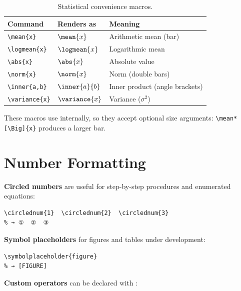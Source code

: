 \begin{table}[htbp]
  \centering
  \caption{Statistical convenience macros.}
  \label{tab:stat-macros}
  \begin{tabular}{@{}lll@{}}
    \toprule
    Command                                 & Renders as & Meaning \\
    \midrule
    \texttt{\textbackslash mean\{x\}}      & $\mean{x}$      & Arithmetic mean (bar) \\
    \texttt{\textbackslash logmean\{x\}}   & $\logmean{x}$   & Logarithmic mean \\
    \texttt{\textbackslash abs\{x\}}       & $\abs{x}$       & Absolute value \\
    \texttt{\textbackslash norm\{x\}}      & $\norm{x}$      & Norm (double bars) \\
    \texttt{\textbackslash inner\{a,b\}}   & $\inner{a}{b}$  & Inner product (angle brackets) \\
    \texttt{\textbackslash variance\{x\}}  & $\variance{x}$  & Variance ($\sigma^2$) \\
    \bottomrule
  \end{tabular}
\end{table}

These macros use  internally, so they accept
optional size arguments: \texttt{\textbackslash mean*[\textbackslash Big]\{x\}} produces
a larger bar.

\section{Number Formatting}

\textbf{Circled numbers} are useful for step-by-step procedures and
enumerated equations:

\begin{verbatim}
\circlednum{1}  \circlednum{2}  \circlednum{3}
% → ①  ②  ③
\end{verbatim}

\textbf{Symbol placeholders} for figures and tables under development:

\begin{verbatim}
\symbolplaceholder{figure}
% → [FIGURE]
\end{verbatim}

\textbf{Custom operators} can be declared with :

